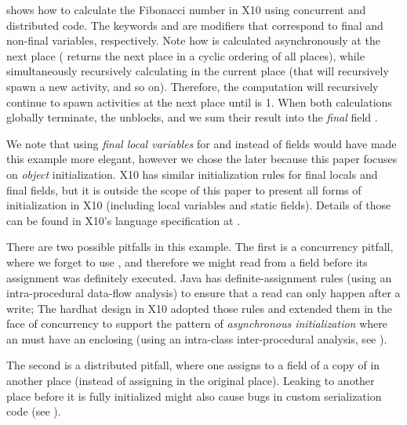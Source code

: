  shows how to calculate the Fibonacci number  in X10
    using concurrent and distributed code.
The keywords  and  are modifiers that correspond to final and non-final variables, respectively.
Note how  is calculated asynchronously at the next place ( returns the next place in a cyclic ordering of all places),
    while simultaneously recursively calculating  in the current place (that will recursively spawn a new activity, and so on).
Therefore, the computation will recursively continue to spawn activities at the next place until  is 1.
When both calculations globally terminate, the  unblocks,
    and we sum their result into the \emph{final} field .

We note that using \emph{final local variables} for  and  instead of fields
    would have made this example
    more elegant, however we chose the later because this paper focuses on \emph{object} initialization.
X10 has similar initialization rules for final locals and final fields,
    but it is outside the scope of this paper to present all forms of initialization in X10
    (including local variables and static fields).
Details of those can be found in X10's language specification at .

There are two possible pitfalls in this example.
The first is a concurrency pitfall, where we forget to use ,
    and therefore we might read from a field before its assignment was definitely executed.
Java has definite-assignment rules (using an intra-procedural data-flow analysis)
    to ensure that a read can only happen after a write;
    The hardhat design in X10 adopted those rules
        and extended them in the face of concurrency to support the pattern of
            \emph{asynchronous initialization}
            where an  must have an enclosing 
    (using an intra-class inter-procedural analysis, see ).

The second is a distributed pitfall, where
    one assigns to a field of a copy of \this in another place (instead of assigning in the original place).
Leaking \this to another place before it is fully initialized
    might also cause bugs in custom serialization code (see ).



